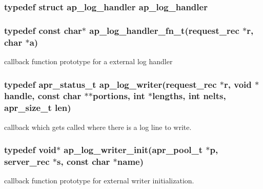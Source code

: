 \subsubsection[{\texorpdfstring{ap\+\_\+log\+\_\+handler}{ap_log_handler}}]{\setlength{\rightskip}{0pt plus 5cm}typedef struct {\bf ap\+\_\+log\+\_\+handler}  {\bf ap\+\_\+log\+\_\+handler}}\hypertarget{group__MOD__LOG__CONFIG_ga11fc4514f41d38dc2bf396d7ad071a88}{}\label{group__MOD__LOG__CONFIG_ga11fc4514f41d38dc2bf396d7ad071a88}
\subsubsection[{\texorpdfstring{ap\+\_\+log\+\_\+handler\+\_\+fn\+\_\+t}{ap_log_handler_fn_t}}]{\setlength{\rightskip}{0pt plus 5cm}typedef const char$\ast$ ap\+\_\+log\+\_\+handler\+\_\+fn\+\_\+t({\bf request\+\_\+rec} $\ast${\bf r}, char $\ast${\bf a})}\hypertarget{group__MOD__LOG__CONFIG_ga8b3bfba0c0ad4bfc84f9c730478a38ed}{}\label{group__MOD__LOG__CONFIG_ga8b3bfba0c0ad4bfc84f9c730478a38ed}
callback function prototype for a external log handler 
\subsubsection[{\texorpdfstring{ap\+\_\+log\+\_\+writer}{ap_log_writer}}]{\setlength{\rightskip}{0pt plus 5cm}typedef {\bf apr\+\_\+status\+\_\+t} ap\+\_\+log\+\_\+writer({\bf request\+\_\+rec} $\ast${\bf r}, {\bf void} $\ast${\bf handle}, const char $\ast$$\ast$portions, {\bf int} $\ast$lengths, {\bf int} {\bf nelts}, {\bf apr\+\_\+size\+\_\+t} {\bf len})}\hypertarget{group__MOD__LOG__CONFIG_gad20836f7acb84e4b4e8ea3031db5aa68}{}\label{group__MOD__LOG__CONFIG_gad20836f7acb84e4b4e8ea3031db5aa68}
callback which gets called where there is a log line to write. 
\subsubsection[{\texorpdfstring{ap\+\_\+log\+\_\+writer\+\_\+init}{ap_log_writer_init}}]{\setlength{\rightskip}{0pt plus 5cm}typedef {\bf void}$\ast$ ap\+\_\+log\+\_\+writer\+\_\+init({\bf apr\+\_\+pool\+\_\+t} $\ast${\bf p}, {\bf server\+\_\+rec} $\ast${\bf s}, const char $\ast${\bf name})}\hypertarget{group__MOD__LOG__CONFIG_ga46489570f9a6d3883db0aad3f4ab93b8}{}\label{group__MOD__LOG__CONFIG_ga46489570f9a6d3883db0aad3f4ab93b8}
callback function prototype for external writer initialization. 

